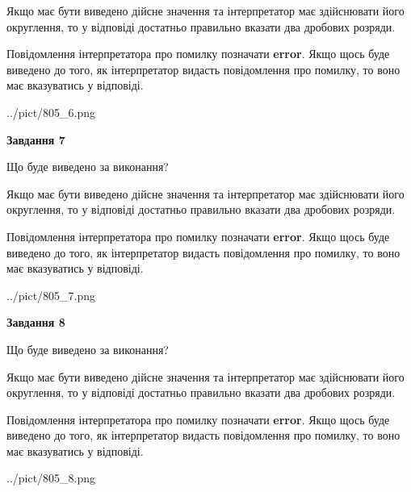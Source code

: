 \documentclass[12pt, ukrainian]{article}
\begin{document}
{\begin {Large}
Якщо має бути виведено дійсне значення та інтерпретатор має здійснювати його округлення, 
то у відповіді достатньо правильно вказати два дробових розряди.

Повідомлення інтерпретатора про помилку позначати \textbf{error}.
Якщо щось буде виведено до того, як інтерпретатор видасть повідомлення про помилку, 
то воно має вказуватись у відповіді. \par

\begin{center}
	{../pict/805_6.png}
\end{center}
\newpage

{\begin {center}\textbf{Завдання 7}\end {center}}\par
Що буде виведено за виконання? \par

Якщо має бути виведено дійсне значення та інтерпретатор має здійснювати його округлення, 
то у відповіді достатньо правильно вказати два дробових розряди.

Повідомлення інтерпретатора про помилку позначати \textbf{error}.
Якщо щось буде виведено до того, як інтерпретатор видасть повідомлення про помилку, 
то воно має вказуватись у відповіді. \par

\begin{center}
	{../pict/805_7.png}
\end{center}
\newpage

{\begin {center}\textbf{Завдання 8}\end {center}}\par
Що буде виведено за виконання? \par

Якщо має бути виведено дійсне значення та інтерпретатор має здійснювати його округлення, 
то у відповіді достатньо правильно вказати два дробових розряди.

Повідомлення інтерпретатора про помилку позначати \textbf{error}.
Якщо щось буде виведено до того, як інтерпретатор видасть повідомлення про помилку, 
то воно має вказуватись у відповіді. \par

\begin{center}
	{../pict/805_8.png}
\end{center}
\newpage


\end{Large}}
\end{document}
